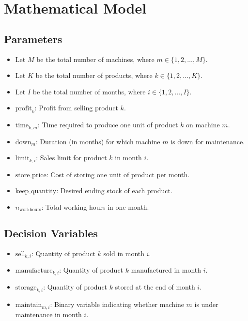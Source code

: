 \documentclass{article}
\begin{document}
\section*{Mathematical Model}

\subsection*{Parameters}
\begin{itemize}
    \item Let \( M \) be the total number of machines, where \( m \in \{1, 2, \ldots, M\} \).
    \item Let \( K \) be the total number of products, where \( k \in \{1, 2, \ldots, K\} \).
    \item Let \( I \) be the total number of months, where \( i \in \{1, 2, \ldots, I\} \).
    
    \item \( \text{profit}_k \): Profit from selling product \( k \).
    \item \( \text{time}_{k,m} \): Time required to produce one unit of product \( k \) on machine \( m \).
    \item \( \text{down}_m \): Duration (in months) for which machine \( m \) is down for maintenance.
    \item \( \text{limit}_{k,i} \): Sales limit for product \( k \) in month \( i \).
    \item \( \text{store\_price} \): Cost of storing one unit of product per month.
    \item \( \text{keep\_quantity} \): Desired ending stock of each product.
    \item \( n_{\text{workhours}} \): Total working hours in one month.
\end{itemize}

\subsection*{Decision Variables}
\begin{itemize}
    \item \( \text{sell}_{k,i} \): Quantity of product \( k \) sold in month \( i \).
    \item \( \text{manufacture}_{k,i} \): Quantity of product \( k \) manufactured in month \( i \).
    \item \( \text{storage}_{k,i} \): Quantity of product \( k \) stored at the end of month \( i \).
    \item \( \text{maintain}_{m,i} \): Binary variable indicating whether machine \( m \) is under maintenance in month \( i \).
\end{itemize}
\end{document}
